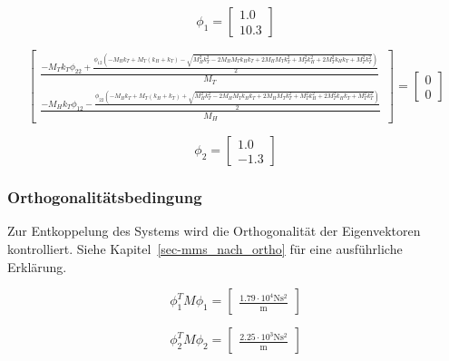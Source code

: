 \documentclass[
  letterpaper,
  DIV=11]{scrreprt}
\begin{document}
\begin{equation}\phi_{1} = \left[\begin{matrix}1.0\\10.3\end{matrix}\right]\end{equation}

\begin{equation}\left[\begin{matrix}\frac{- M_{T} k_{T} \phi_{22} + \frac{\phi_{12} \left(- M_{H} k_{T} + M_{T} \left(k_{H} + k_{T}\right) - \sqrt{M_{H}^{2} k_{T}^{2} - 2 M_{H} M_{T} k_{H} k_{T} + 2 M_{H} M_{T} k_{T}^{2} + M_{T}^{2} k_{H}^{2} + 2 M_{T}^{2} k_{H} k_{T} + M_{T}^{2} k_{T}^{2}}\right)}{2}}{M_{T}}\\\frac{- M_{H} k_{T} \phi_{12} - \frac{\phi_{22} \left(- M_{H} k_{T} + M_{T} \left(k_{H} + k_{T}\right) + \sqrt{M_{H}^{2} k_{T}^{2} - 2 M_{H} M_{T} k_{H} k_{T} + 2 M_{H} M_{T} k_{T}^{2} + M_{T}^{2} k_{H}^{2} + 2 M_{T}^{2} k_{H} k_{T} + M_{T}^{2} k_{T}^{2}}\right)}{2}}{M_{H}}\end{matrix}\right] = \left[\begin{matrix}0\\0\end{matrix}\right]\end{equation}

\begin{equation}\phi_{2} = \left[\begin{matrix}1.0\\-1.3\end{matrix}\right]\end{equation}

\hypertarget{orthogonalituxe4tsbedingung-1}{%
\subsubsection{Orthogonalitätsbedingung}\label{orthogonalituxe4tsbedingung-1}}

Zur Entkoppelung des Systems wird die Orthogonalität der Eigenvektoren
kontrolliert. Siehe Kapitel~\ref{sec-mms_nach_ortho} für eine
ausführliche Erklärung.

\begin{equation}\phi_{1}^{T} M \phi_{1} = \left[\begin{matrix}\frac{1.79 \cdot 10^{4} \text{N} \text{s}^{2}}{\text{m}}\end{matrix}\right]\end{equation}

\begin{equation}\phi_{2}^{T} M \phi_{2} = \left[\begin{matrix}\frac{2.25 \cdot 10^{3} \text{N} \text{s}^{2}}{\text{m}}\end{matrix}\right]\end{equation}
\end{document}
